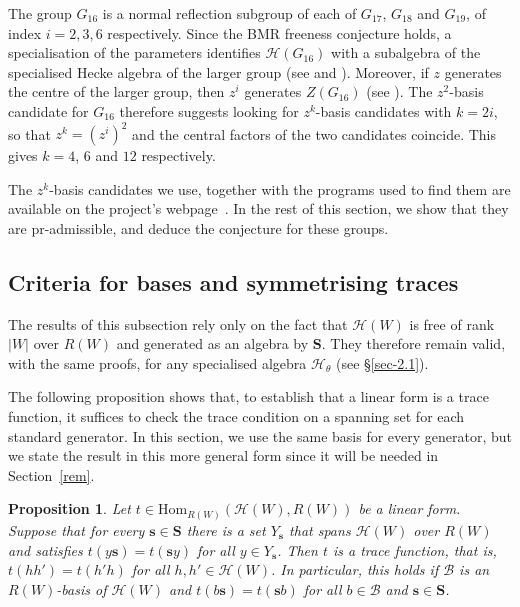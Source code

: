 \documentclass[11pt, reqno]{amsart}
\newcommand{\cB}{\mathcal{B}}
\newcommand{\cH}{\mathcal{H}}
\newcommand{\Hom}{\mathrm{Hom}}
\numberwithin{equation}{section}
\newtheorem{proposition}[theorem]{Proposition}
\theoremstyle{remark}
\begin{document}
The group $G_{16}$ is a normal reflection subgroup of each of
$G_{17}$, $G_{18}$ and $G_{19}$, of index $i=2,3,6$ respectively.
Since the BMR freeness conjecture holds, a specialisation of the
parameters identifies $\mathcal H(G_{16})$ with a subalgebra of the
specialised Hecke algebra of the larger group (see \cite[Proposition 4.2]{Ma2} and
\cite[Section~3.2]{ChPf}). Moreover, if $z$ generates the centre of the
larger group, then $z^{i}$ generates $Z(G_{16})$ (see
\cite[Section~1]{ChPf}). The $z^2$-basis candidate for $G_{16}$
therefore suggests looking for $z^k$-basis candidates with $k=2i$, so
that $z^k=(z^{i})^2$ and the central factors of the two candidates
coincide. This gives $k=4$, $6$ and $12$ respectively.

The $z^k$-basis candidates we use, together with the programs used to find them are available on the
project's webpage~\cite{web}. In the rest of this section, we show that they are
$\mathrm{pr}$-admissible, and deduce the conjecture for these groups.


\subsection{Criteria for bases and symmetrising traces}\label{main1}
The results of this subsection rely only on the fact that $\cH(W)$ is free of rank $|W|$ over $R(W)$ and generated as an algebra by $
\mathbf S$. They therefore remain valid, with the same proofs, for any specialised algebra $\mathcal H_\theta$ (see \S\ref{sec-2.1}).

The following proposition shows that, to establish  that a linear form is a trace function, it suffices to check the trace condition on a spanning set for each standard generator. In this section, we use the same basis for every generator, but we state the result in this more general form since it will be needed in Section~\ref{rem}.

\begin{proposition}\label{symcond}
	Let $t\in\Hom_{R(W)}(\cH(W),R(W))$ be a linear form. Suppose that for every
	$\mathbf s\in\mathbf S$ there is a set $Y_{\mathbf s}$ that spans $\cH(W)$ over
	$R(W)$ and satisfies $t(y\mathbf s)=t(\mathbf sy)$ for all $y\in Y_{\mathbf s}$.
	Then $t$ is a trace function, that is, $t(hh')=t(h'h)$ for all $h,h'\in\cH(W)$.
	In particular, this holds if $\cB$ is an $R(W)$-basis of $\cH(W)$ and
	$t(b\mathbf s)=t(\mathbf sb)$ for all $b\in\cB$ and $\mathbf s\in\mathbf S$.
\end{proposition}
\end{document}
